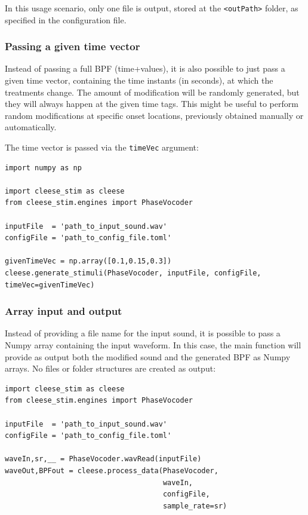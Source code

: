 \documentclass[oneside,10pt]{article}
\begin{document}
In this usage scenario, only one file is output, stored at the
\texttt{<outPath>} folder, as specified in the configuration file.

\subsubsection{Passing a given time vector}

Instead of passing a full BPF (time+values), it is also possible to just pass a
given time vector, containing the time instants (in seconds), at which the
treatments change. The amount of modification will be randomly generated, but
they will always happen at the given time tags. This might be useful to perform
random modifications at specific onset locations, previously obtained manually
or automatically.

The time vector is passed via the \texttt{timeVec} argument:

\vspace{8pt}
\begin{verbatim}
import numpy as np

import cleese_stim as cleese
from cleese_stim.engines import PhaseVocoder

inputFile  = 'path_to_input_sound.wav'
configFile = 'path_to_config_file.toml'

givenTimeVec = np.array([0.1,0.15,0.3])
cleese.generate_stimuli(PhaseVocoder, inputFile, configFile, timeVec=givenTimeVec)
\end{verbatim}
\vspace{8pt}

\subsubsection{Array input and output}

Instead of providing a file name for the input sound, it is possible to pass a
Numpy array containing the input waveform. In this case, the main function will
provide as output both the modified sound and the generated BPF as Numpy
arrays. No files or folder structures are created as output:

\vspace{8pt}
\begin{verbatim}
import cleese_stim as cleese
from cleese_stim.engines import PhaseVocoder

inputFile  = 'path_to_input_sound.wav'
configFile = 'path_to_config_file.toml'

waveIn,sr,__ = PhaseVocoder.wavRead(inputFile)
waveOut,BPFout = cleese.process_data(PhaseVocoder,
                                     waveIn,
                                     configFile,
                                     sample_rate=sr)
\end{verbatim}
\vspace{8pt}
\end{document}
